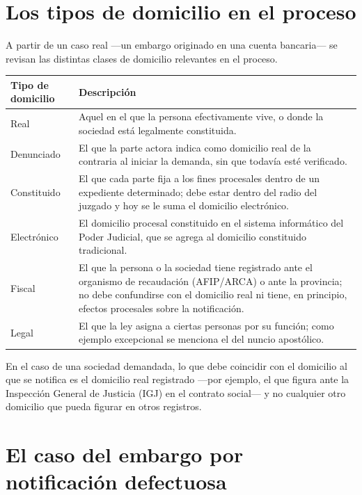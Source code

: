 \documentclass[12pt,oneside]{book}
\begin{document}
\section{Los tipos de domicilio en el proceso}

A partir de un caso real ---un embargo originado en una cuenta bancaria--- se revisan las distintas clases de domicilio relevantes en el proceso.

\begin{table}[H]
\centering
\begin{tabularx}{\textwidth}{
    >{\raggedright\arraybackslash}p{}
    >{\raggedright\arraybackslash}X
}
\toprule
\textbf{Tipo de domicilio} & \textbf{Descripción} \\
\midrule
Real & Aquel en el que la persona efectivamente vive, o donde la sociedad está legalmente constituida. \\
Denunciado & El que la parte actora indica como domicilio real de la contraria al iniciar la demanda, sin que todavía esté verificado. \\
Constituido & El que cada parte fija a los fines procesales dentro de un expediente determinado; debe estar dentro del radio del juzgado y hoy se le suma el domicilio electrónico. \\
Electrónico & El domicilio procesal constituido en el sistema informático del Poder Judicial, que se agrega al domicilio constituido tradicional. \\
Fiscal & El que la persona o la sociedad tiene registrado ante el organismo de recaudación (AFIP/ARCA) o ante la provincia; no debe confundirse con el domicilio real ni tiene, en principio, efectos procesales sobre la notificación. \\
Legal & El que la ley asigna a ciertas personas por su función; como ejemplo excepcional se menciona el del nuncio apostólico. \\
\bottomrule
\end{tabularx}
\end{table}

\begin{important}
En el caso de una sociedad demandada, lo que debe coincidir con el domicilio al que se notifica es el domicilio real registrado ---por ejemplo, el que figura ante la Inspección General de Justicia (IGJ) en el contrato social--- y no cualquier otro domicilio que pueda figurar en otros registros.
\end{important}

\section{El caso del embargo por notificación defectuosa}
\end{document}
